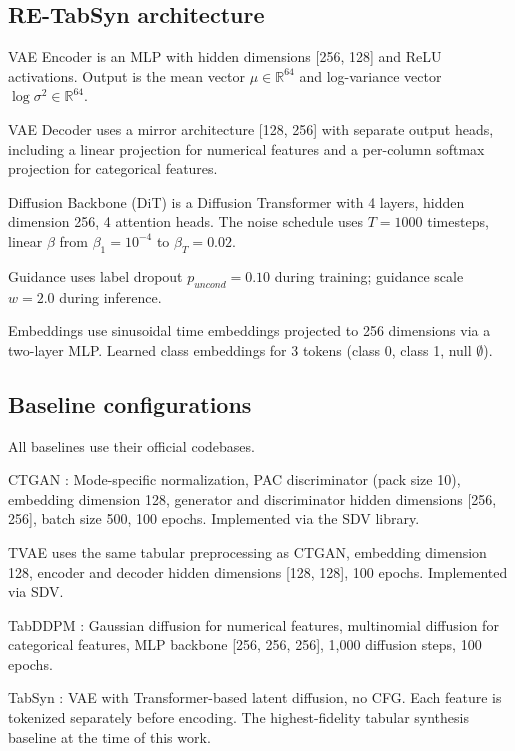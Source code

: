 \subsection{RE-TabSyn architecture}

VAE Encoder is an MLP with hidden dimensions [256, 128] and ReLU activations. Output is the mean vector $\mu \in \mathbb{R}^{64}$ and log-variance vector $\log \sigma^2 \in \mathbb{R}^{64}$.

VAE Decoder uses a mirror architecture [128, 256] with separate output heads, including a linear projection for numerical features and a per-column softmax projection for categorical features.

Diffusion Backbone (DiT) is a Diffusion Transformer with 4 layers, hidden dimension 256, 4 attention heads. The noise schedule uses $T = 1000$ timesteps, linear $\beta$ from $\beta_1 = 10^{-4}$ to $\beta_T = 0.02$.

Guidance uses label dropout $p_{uncond} = 0.10$ during training; guidance scale $w = 2.0$ during inference.

Embeddings use sinusoidal time embeddings projected to 256 dimensions via a two-layer MLP. Learned class embeddings for 3 tokens (class 0, class 1, null $\emptyset$).

\subsection{Baseline configurations}

All baselines use their official codebases.

CTGAN \cite{xu2019ctgan}: Mode-specific normalization, PAC discriminator (pack size 10), embedding dimension 128, generator and discriminator hidden dimensions [256, 256], batch size 500, 100 epochs. Implemented via the SDV library.

TVAE uses the same tabular preprocessing as CTGAN, embedding dimension 128, encoder and decoder hidden dimensions [128, 128], 100 epochs. Implemented via SDV.

TabDDPM \cite{kotelnikov2023tabddpm}: Gaussian diffusion for numerical features, multinomial diffusion for categorical features, MLP backbone [256, 256, 256], 1,000 diffusion steps, 100 epochs.

TabSyn \cite{zhang2024tabsyn}: VAE with Transformer-based latent diffusion, no CFG. Each feature is tokenized separately before encoding. The highest-fidelity tabular synthesis baseline at the time of this work.

